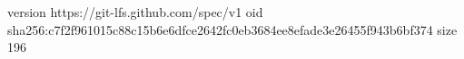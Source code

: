 version https://git-lfs.github.com/spec/v1
oid sha256:c7f2f961015c88c15b6e6dfce2642fc0eb3684ee8efade3e26455f943b6bf374
size 196
